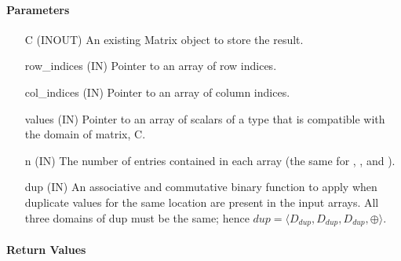 \paragraph{Parameters}

\begin{itemize}[leftmargin=1.1in]
    \item[{\sf C}]      ({\sf INOUT}) An existing Matrix object to store the result.
    \item[{\sf row\_indices}] ({\sf IN}) Pointer to an array of row indices. 
    \item[{\sf col\_indices}] ({\sf IN}) Pointer to an array of column indices. 
    \item[{\sf values}] ({\sf IN}) Pointer to an array of scalars of a type that
                                   is compatible with the domain of matrix, {\sf C}.
    \item[{\sf n}]  ({\sf IN}) The number of entries contained in each array (the same for , , and ).
    \item[{\sf dup}]    ({\sf IN}) An associative and commutative binary function to apply when duplicate values 
                        for the same location are present in the input arrays.  
			All three domains of {\sf dup} must be the same; hence
	    $dup=\langle D_{dup},D_{dup},D_{dup},\oplus \rangle$.
\end{itemize}

\paragraph{Return Values}

